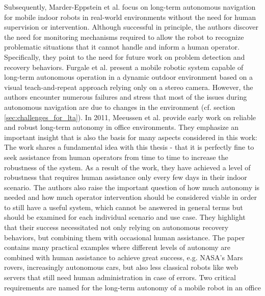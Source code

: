 \documentclass[english, master, utf8]{base/thesis_KBS}
\begin{document}
Subsequently, Marder-Eppstein et al. \cite{MarderEppstein:2010} focus on long-term autonomous navigation for mobile indoor
robots in real-world environments without the need for human supervision or intervention. Although successful in principle, the authors discover the need for monitoring mechanisms
required to allow the robot to recognize problematic situations that it cannot handle and inform a human operator. Specifically, they point to the need for future work on problem
detection and recovery behaviors.\newline
Furgale et al. \cite{Furgale:2010} present a mobile robotic system capable of long-term autonomous operation in a dynamic outdoor environment based on a visual teach-and-repeat
approach relying only on a stereo camera. However, the authors encounter numerous failures and stress that most of the issues during autonomous navigation are due to changes in the
environment (cf. section \ref{sec:challenges_for_lta}).\newline
In 2011, Meeussen et al. \cite{Meeussen:2011} provide early work on reliable and robust long-term autonomy in office environments. They emphasize an important insight that is also the basis
for many aspects considered in this work:  \cite{Meeussen:2011} The work shares a fundamental idea with this thesis - that it is perfectly
fine to seek assistance from human operators from time to time to increase the robustness of the system. As a result of the work, they have achieved a level of robustness that
requires human assistance only every few days in their indoor scenario. The authors also raise the important question of how much autonomy is needed and how much operator intervention
should be considered viable in order to still have a useful system, which cannot be answered in general terms but should be examined for each individual scenario and use case. They
highlight that their success necessitated not only relying on autonomous recovery behaviors, but combining them with occasional human assistance. The paper contains many practical
examples where different levels of autonomy are combined with human assistance to achieve great success, e.g. NASA's Mars rovers, increasingly autonomous cars, but also less classical
robots like web servers that still need human administration in case of errors. Two critical requirements are named for the long-term autonomy of a mobile robot in an office
\end{document}

